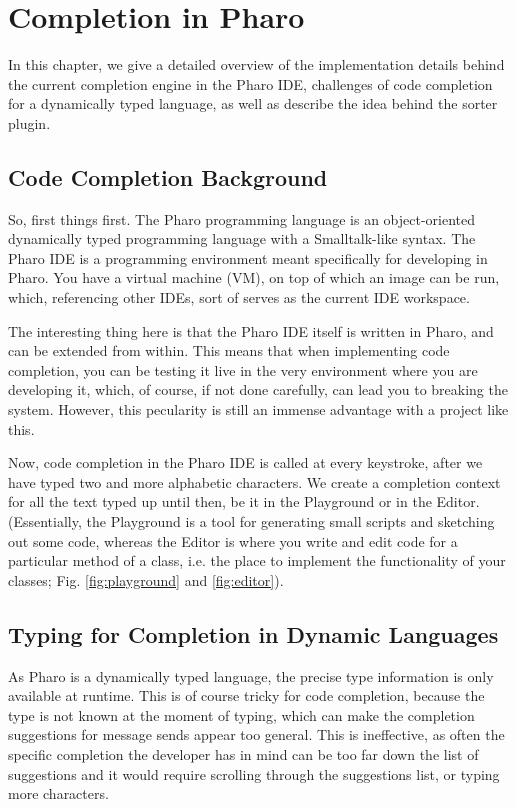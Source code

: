 \chapter{Completion in Pharo}
\label{chap:PharoCompletion}

In this chapter, we give a detailed overview of the implementation details behind the current completion engine in the Pharo IDE, challenges of code completion for a dynamically typed language, as well as describe the idea behind the sorter plugin.

\section{Code Completion Background}
\label{sec:PharoCompletion-Background}
So, first things first. The Pharo programming language is an object-oriented dynamically typed programming language with a Smalltalk-like syntax. The Pharo IDE is a programming environment meant specifically for developing in Pharo. You have a virtual machine (VM), on top of which an image can be run, which, referencing other IDEs, sort of serves as the current IDE workspace.

The interesting thing here is that the Pharo IDE itself is written in Pharo, and can be extended from within. This means that when implementing code completion, you can be testing it live in the very environment where you are developing it, which, of course, if not done carefully, can lead you to breaking the system. However, this pecularity is still an immense advantage with a project like this.

Now, code completion in the Pharo IDE is called at every keystroke, after we have typed two and more alphabetic characters. We create a completion context for all the text typed up until then, be it in the Playground or in the Editor. (Essentially, the Playground is a tool for generating small scripts and sketching out some code, whereas the Editor is where you write and edit code for a particular method of a class, i.e. the place to implement the functionality of your classes; Fig. \ref{fig:playground} and \ref{fig:editor}).

\section{Typing for Completion in Dynamic Languages}
\label{sec:PharoCompletion-Typing}
As Pharo is a dynamically typed language, the precise type information is only available at runtime. This is of course tricky for code completion, because the type is not known at the moment of typing, which can make the completion suggestions for message sends appear too general. This is ineffective, as often the specific completion the developer has in mind can be too far down the list of suggestions and it would require scrolling through the suggestions list, or typing more characters.

